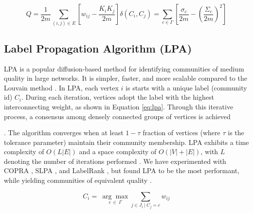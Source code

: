 \begin{equation}
\label{eq:modularity}
  Q
  = \frac{1}{2m} \sum_{(i, j) \in E} \left[w_{ij} - \frac{K_i K_j}{2m}\right] \delta(C_i, C_j)
  = \sum_{c \in \Gamma} \left[\frac{\sigma_c}{2m} - \left(\frac{\Sigma_c}{2m}\right)^2\right]
\end{equation}





\subsection{Label Propagation Algorithm (LPA)}
\label{sec:about-rak}

LPA \cite{com-raghavan07} is a popular diffusion-based method for identifying communities of medium quality in large networks. It is simpler, faster, and more scalable compared to the Louvain method \cite{com-blondel08}. In LPA, each vertex $i$ is starts with a unique label (community id) $C_i$. During each iteration, vertices adopt the label with the highest interconnecting weight, as shown in Equation \ref{eq:lpa}. Through this iterative process, a consensus among densely connected groups of vertices is achieved. The algorithm converges when at least $1-\tau$ fraction of vertices (where $\tau$ is the tolerance parameter) maintain their community membership. LPA exhibits a time complexity of $O(L |E|)$ and a space complexity of $O(|V| + |E|)$, with $L$ denoting the number of iterations performed \cite{com-raghavan07}. We have experimented with COPRA \cite{com-gregory10}, SLPA \cite{com-xie11}, and LabelRank \cite{com-xie13}, but found LPA to be the most performant, while yielding communities of equivalent quality \cite{sahu2023selecting}.

\begin{equation}
\label{eq:lpa}
  C_i =\ \underset{c\ \in \ \Gamma}{\arg\max} { \sum_{j \in J_i\ |\ C_j = c} w_{ij} }
\end{equation}

